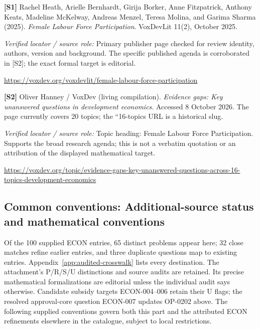 \documentclass[11pt,a4paper]{article}
\begin{document}
{\footnotesize\raggedright
\par\noindent\textbf{[S1]} Rachel Heath, Arielle Bernhardt, Girija Borker, Anne Fitzpatrick, Anthony Keats, Madeline McKelway, Andreas Menzel, Teresa Molina, and Garima Sharma (2025). \emph{Female Labour Force Participation}. VoxDevLit 11(2), October 2025.\par \textit{Verified locator / source role:} Primary publisher page checked for review identity, authors, version and background. The specific published agenda is corroborated in [S2]; the exact formal target is editorial.\par \url{https://voxdev.org/voxdevlit/female-labour-force-participation}\par\smallskip
\par\noindent\textbf{[S2]} Oliver Hanney / VoxDev (living compilation). \emph{Evidence gaps: Key unanswered questions in development economics}. Accessed 8 October 2026. The page currently covers 20 topics; the ``16-topics URL is a historical slug.\par \textit{Verified locator / source role:} Topic heading: Female Labour Force Participation. Supports the broad research agenda; this is not a verbatim quotation or an attribution of the displayed mathematical target.\par \url{https://voxdev.org/topic/evidence-gaps-key-unanswered-questions-across-16-topics-development-economics}\par\smallskip
}

\subsection*{Common conventions: Additional-source status and mathematical conventions}

\label{audited:conventions}

Of the 100 supplied ECON entries, 65 distinct problems appear here; 32 close
matches refine earlier entries, and three duplicate questions map to existing
entries. Appendix~\ref{app:audited-crosswalk} lists every destination.
The attachment's P/R/S/U distinctions and source audits are retained. Its
precise mathematical formalizations are editorial unless the individual audit
says otherwise. Candidate subsidy targets ECON-004--006 retain their U flags;
the resolved approval-core question ECON-007 updates OP-0202 above.
The following supplied conventions govern both this part and the attributed
ECON refinements elsewhere in the catalogue, subject to local restrictions.
\end{document}
